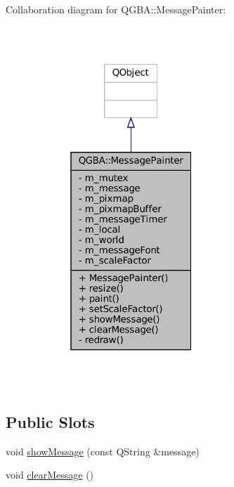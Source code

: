 Collaboration diagram for Q\+G\+BA\+:\+:Message\+Painter\+:
\nopagebreak
\begin{figure}[H]
\begin{center}
\leavevmode
\includegraphics[width=208pt]{class_q_g_b_a_1_1_message_painter__coll__graph}
\end{center}
\end{figure}
\subsection*{Public Slots}
\begin{DoxyCompactItemize}
\item 
void \mbox{\hyperlink{class_q_g_b_a_1_1_message_painter_acba4e5689aab5656c16fe87e04545558}{show\+Message}} (const Q\+String \&message)
\item 
void \mbox{\hyperlink{class_q_g_b_a_1_1_message_painter_a6880cc16df94e00ff0d57869f93022b0}{clear\+Message}} ()
\end{DoxyCompactItemize}
